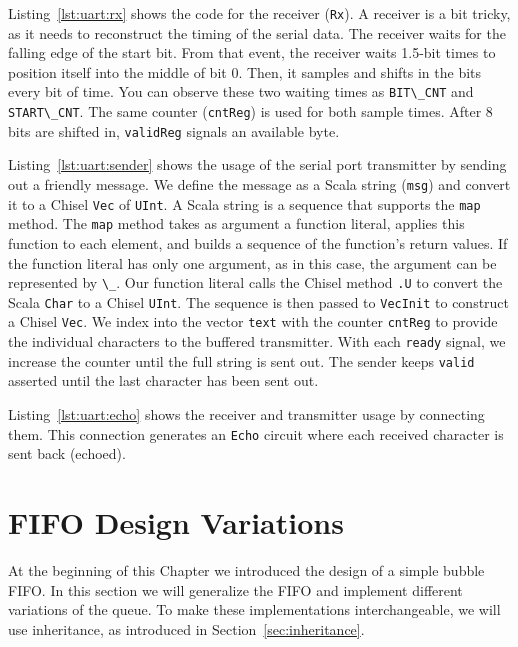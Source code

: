 \documentclass[%
    10pt,
    headinclude, footinclude=false,
    openright, %
    notitlepage,
    cleardoublepage=empty,
    headsepline,
    numbers=noenddot,
    bibliography=totoc, index=totoc,
    ]{scrbook}
\newcommand{\code}[1]{{\lstinline[basicstyle=\small\ttfamily]{#1}}}
\begin{document}

Listing~\ref{lst:uart:rx} shows the code for the receiver (\code{Rx}).
A receiver is a bit tricky, as it needs to reconstruct the timing of
the serial data. The receiver waits for the falling edge of the start bit.
From that event, the receiver waits 1.5-bit times to position itself into the middle
of bit 0. Then, it samples and shifts in the bits every bit of time. You can observe these
two waiting times as \code{BIT\_CNT} and \code{START\_CNT}.
The same counter (\code{cntReg}) is used for both sample times.
After 8 bits are shifted in, \code{validReg} signals an available byte.


Listing~\ref{lst:uart:sender} shows the usage of the serial port transmitter
by sending out a friendly message. We define the message as a Scala
string (\code{msg}) and convert it to a Chisel \code{Vec} of \code{UInt}.
A Scala string is a sequence that supports the \code{map} method.
The \code{map} method takes as argument a function literal, applies this function to
each element, and builds a sequence of the function's return values.
If the function literal has only one argument, as in this case, the
argument can be represented by \code{\_}. Our function literal calls
the Chisel method \code{.U} to convert the Scala \code{Char} to a Chisel
\code{UInt}. The sequence is then passed to \code{VecInit} to construct
a Chisel \code{Vec}. We index into the vector \code{text} with the counter
\code{cntReg} to provide the individual characters to the buffered transmitter.
With each \code{ready} signal, we increase the counter until the full string
is sent out. The sender keeps \code{valid} asserted until the last character
has been sent out.


Listing~\ref{lst:uart:echo} shows the receiver and transmitter
usage by connecting them. This connection generates an \code{Echo} circuit where each
received character is sent back (echoed).

\section{FIFO Design Variations}
\label{sec:more:fifo}

At the beginning of this Chapter we introduced the design of a simple bubble FIFO.
In this section we will generalize the FIFO and implement different variations of the queue.
To make these implementations interchangeable, we will use inheritance,
as introduced in Section~\ref{sec:inheritance}.
\end{document}

